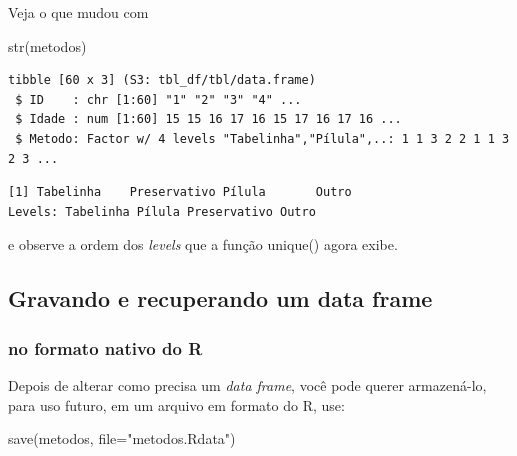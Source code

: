 \documentclass[
]{article}
\newenvironment{Shaded}{\begin{snugshade}}{\end{snugshade}}
\newcommand{\AttributeTok}[1]{\textcolor[rgb]{0.77,0.63,0.00}{#1}}
\newcommand{\FunctionTok}[1]{\textcolor[rgb]{0.00,0.00,0.00}{#1}}
\newcommand{\NormalTok}[1]{#1}
\newcommand{\SpecialCharTok}[1]{\textcolor[rgb]{0.00,0.00,0.00}{#1}}
\newcommand{\StringTok}[1]{\textcolor[rgb]{0.31,0.60,0.02}{#1}}
\begin{document}
Veja o que mudou com

\begin{Shaded}
\begin{Highlighting}[]
\FunctionTok{str}\NormalTok{(metodos)}
\end{Highlighting}
\end{Shaded}

\begin{verbatim}
tibble [60 x 3] (S3: tbl_df/tbl/data.frame)
 $ ID    : chr [1:60] "1" "2" "3" "4" ...
 $ Idade : num [1:60] 15 15 16 17 16 15 17 16 17 16 ...
 $ Metodo: Factor w/ 4 levels "Tabelinha","Pílula",..: 1 1 3 2 2 1 1 3 2 3 ...
\end{verbatim}

\begin{Shaded}
\end{Shaded}

\begin{verbatim}
[1] Tabelinha    Preservativo Pílula       Outro       
Levels: Tabelinha Pílula Preservativo Outro
\end{verbatim}

e observe a ordem dos \emph{levels} que a função unique() agora exibe.

\hypertarget{gravando-e-recuperando-um-data-frame}{%
\subsection{Gravando e recuperando um data
frame}\label{gravando-e-recuperando-um-data-frame}}

\hypertarget{no-formato-nativo-do-r}{%
\subsubsection{no formato nativo do R}\label{no-formato-nativo-do-r}}

Depois de alterar como precisa um \emph{data frame}, você pode querer
armazená-lo, para uso futuro, em um arquivo em formato do R, use:

\begin{Shaded}
\begin{Highlighting}[]
\FunctionTok{save}\NormalTok{(metodos, }\AttributeTok{file=}\StringTok{"metodos.Rdata"}\NormalTok{)}
\end{Highlighting}
\end{Shaded}
\end{document}
